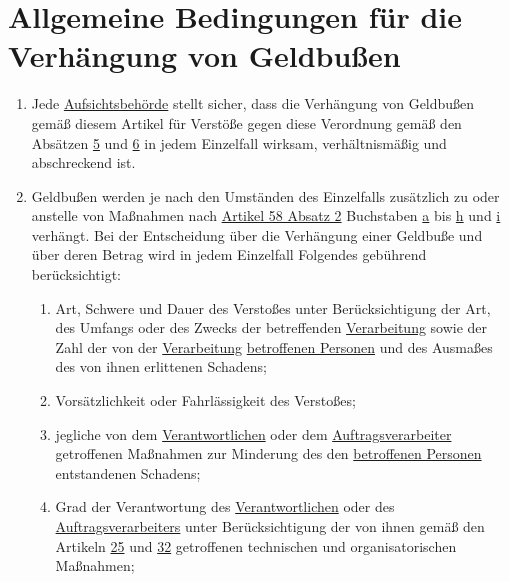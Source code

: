 \chapter{Allgemeine Bedingungen für die Verhängung von Geldbußen}
\label{ch:83}


\begin{enumerate}

  \item Jede \hyperref[itm:04-21]{Aufsichtsbehörde} stellt sicher, dass die Verhängung von Geldbußen gemäß diesem Artikel für Verstöße gegen
   diese Verordnung gemäß den Absätzen \hyperref[itm:83-5]{5} und \hyperref[itm:83-6]{6} in jedem Einzelfall wirksam,
   verhältnismäßig und abschreckend ist.
  \label{itm:83-1}

  \item Geldbußen werden je nach den Umständen des Einzelfalls zusätzlich zu oder anstelle von Maßnahmen nach \hyperref
   [itm:58-2]{Artikel 58 Absatz 2} Buchstaben \hyperref[itm:58-2a]{a} bis \hyperref[itm:58-2h]{h} und \hyperref
   [itm:58-2i]{i} verhängt. Bei der Entscheidung über die Verhängung einer Geldbuße und über deren Betrag wird in jedem
   Einzelfall Folgendes gebührend berücksichtigt:
  \label{itm:83-2}

  \begin{enumerate}
  
    \item Art, Schwere und Dauer des Verstoßes unter Berücksichtigung der Art, des Umfangs oder des Zwecks der
     betreffenden \hyperref[itm:04-2]{Verarbeitung} sowie der Zahl der von der \hyperref[itm:04-2]{Verarbeitung} \hyperref[itm:04-1]{betroffenen Personen} und des Ausmaßes des von
     ihnen erlittenen Schadens;
    \label{itm:83-2a}

    \item Vorsätzlichkeit oder Fahrlässigkeit des Verstoßes;
    \label{itm:83-2b}

    \item jegliche von dem \hyperref[itm:04-7]{Verantwortlichen} oder dem \hyperref[itm:04-8]{Auftragsverarbeiter} getroffenen Maßnahmen zur Minderung des den
     \hyperref[itm:04-1]{betroffenen Personen} entstandenen Schadens;
    \label{itm:83-2c}

    \item Grad der Verantwortung des \hyperref[itm:04-7]{Verantwortlichen} oder des \hyperref[itm:04-8]{Auftragsverarbeiters} unter Berücksichtigung der von ihnen
     gemäß den Artikeln \hyperref[ch:25]{25} und \hyperref[ch:32]{32} getroffenen technischen und organisatorischen
     Maßnahmen;
    \label{itm:83-2d}


\end{enumerate}
\end{enumerate}
